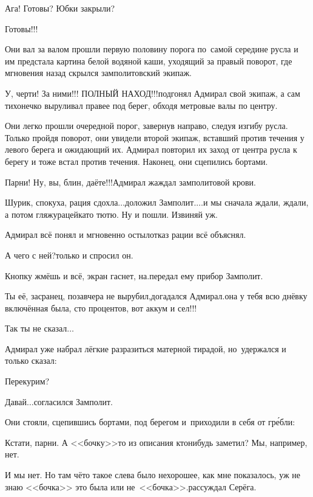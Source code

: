 \diagdash Ага! Готовы? Юбки закрыли?

\diagdash Готовы!!!

Они вал за валом прошли первую половину порога по~самой середине русла и им предстала картина белой водяной каши, уходящий за правый поворот, где мгновения назад скрылся замполитовский экипаж.

\diagdash У, черти! За ними!!! {\large ПОЛНЫЙ НАХОД!!!}\mdash подгонял Адмирал свой экипаж, а сам тихонечко выруливал правее под берег, обходя метровые валы по центру. 

Они легко прошли очередной порог, завернув направо, следуя изгибу русла. Только пройдя поворот, они увидели второй экипаж, вставший против течения у левого берега и ожидающий их. Адмирал повторил их заход от центра русла к берегу и тоже встал против течения. Наконец, они сцепились бортами.

\diagdash Парни! Ну, вы, блин, даёте!!!\mdash Адмирал жаждал замполитовой крови.

\diagdash Шурик, спокуха, рация сдохла$\ldots$\mdash доложил Замполит.\mdash$\ldots$и мы сначала ждали, ждали, а потом гляжу\mdash рацейка\sdash то тю\sdash тю. Ну и пошли. Извиняй уж.

Адмирал всё понял и мгновенно остыл\mdash отказ рации всё объяснял.

\diagdash А чего с ней?\mdash только и спросил он.

\diagdash Кнопку жмёшь и всё, экран гаснет, на.\mdash передал ему прибор Замполит.

\diagdash Ты её, засранец, позавчера не вырубил,\mdash догадался Адмирал.\mdash она у тебя всю днёвку включённая была, сто процентов, вот аккум и сел!!!

\diagdash Так ты не сказал$\ldots$

Адмирал уже набрал лёгкие разразиться матерной тирадой, но~удержался и только сказал:

\diagdash Перекурим?

\diagdash Давай$\ldots$\mdash согласился Замполит.

Они стояли, сцепившись бортами, под берегом и~приходили в себя от гр\'ебли: 

\diagdash Кстати, парни. А <<бочку>>\sdash то из описания кто\sdash нибудь заметил? Мы, например, нет. 

\diagdash И мы нет. Но там чё\sdash то такое слева было нехорошее, как мне показалось, уж не знаю <<бочка>> это была или не~<<бочка>>.\mdash рассуждал Серёга.


